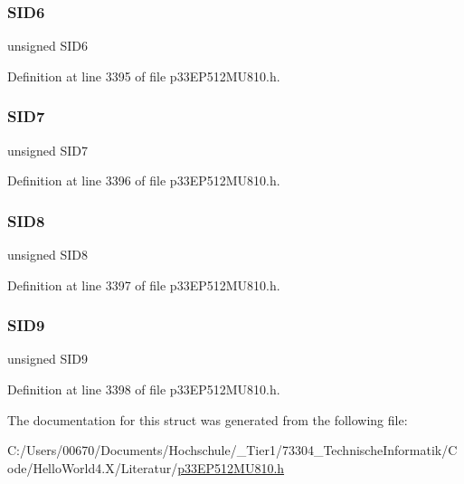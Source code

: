 \subsubsection{\texorpdfstring{S\+I\+D6}{SID6}}
{\footnotesize\ttfamily unsigned S\+I\+D6}



Definition at line 3395 of file p33\+E\+P512\+M\+U810.\+h.

\mbox{\label{structtag_c1_r_x_m0_s_i_d_b_i_t_s_a34097fb76decd431701fa2d86a22328e}} 
\subsubsection{\texorpdfstring{S\+I\+D7}{SID7}}
{\footnotesize\ttfamily unsigned S\+I\+D7}



Definition at line 3396 of file p33\+E\+P512\+M\+U810.\+h.

\mbox{\label{structtag_c1_r_x_m0_s_i_d_b_i_t_s_afe74894633244fdb0b0c01b4e8c522e7}} 
\subsubsection{\texorpdfstring{S\+I\+D8}{SID8}}
{\footnotesize\ttfamily unsigned S\+I\+D8}



Definition at line 3397 of file p33\+E\+P512\+M\+U810.\+h.

\mbox{\label{structtag_c1_r_x_m0_s_i_d_b_i_t_s_a33587704948067005c2a6a3ccc503c99}} 
\subsubsection{\texorpdfstring{S\+I\+D9}{SID9}}
{\footnotesize\ttfamily unsigned S\+I\+D9}



Definition at line 3398 of file p33\+E\+P512\+M\+U810.\+h.



The documentation for this struct was generated from the following file\+:\begin{DoxyCompactItemize}
\item 
C\+:/\+Users/00670/\+Documents/\+Hochschule/\+\_\+\+Tier1/73304\+\_\+\+Technische\+Informatik/\+Code/\+Hello\+World4.\+X/\+Literatur/\hyperlink{p33_e_p512_m_u810_8h}{p33\+E\+P512\+M\+U810.\+h}\end{DoxyCompactItemize}
